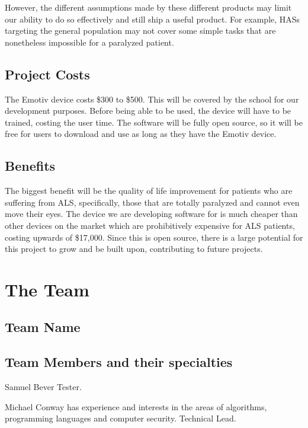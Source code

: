 \documentclass{report}
\begin{document}
However, the different assumptions made by these different products may limit
our ability to do so effectively and still ship a useful product. For example,
HASs targeting the general population may not cover some simple tasks that are
nonetheless impossible for a paralyzed patient.

\subsection*{Project Costs}
The Emotiv device costs \$300 to \$500. This will be covered by the school for our development purposes. Before being able to be used, the device will have to be trained, costing the user time. The software will be fully open source, so it will be free for users to download and use as long as they have the Emotiv device.

\subsection*{Benefits}
The biggest benefit will be the quality of life improvement for patients who are suffering from ALS, specifically, those that are totally paralyzed and cannot even move their eyes. The device we are developing software for is much cheaper than other devices on the market which are prohibitively expensive for ALS patients, costing upwards of \$17,000. Since this is open source, there is a large potential for this project to grow and be built upon, contributing to future projects.

\newpage
\section*{\centering The Team}

\subsection*{Team Name}


\subsection*{Team Members and their specialties}

Samuel Bever Tester.

Michael Conway has experience and interests in the areas of algorithms,
programming languages and computer security. Technical Lead. %
\end{document}
